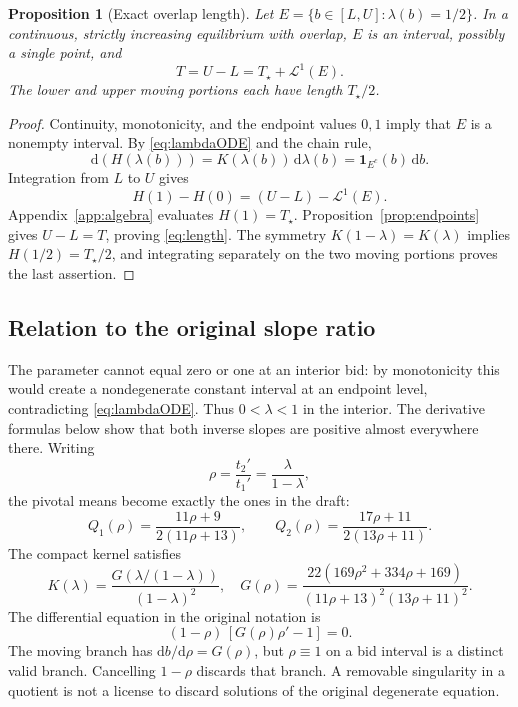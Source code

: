 \documentclass[11pt,a4paper]{article}
\numberwithin{equation}{section}
\newtheorem{proposition}[theorem]{Proposition}
\theoremstyle{definition}
\theoremstyle{remark}
\newcommand{\dd}{\,\mathrm d}
\newcommand{\Leb}{\mathcal L^1}
\newcommand{\ind}{\mathbf 1}
\newcommand{\Ts}{T_\star}
\begin{document}
\begin{proposition}[Exact overlap length]
\label{prop:length}
Let $E=\{b\in[L,U]:\lambda(b)=1/2\}$. In a continuous, strictly increasing equilibrium with overlap, $E$ is an interval, possibly a single point, and
\begin{equation}
\label{eq:length}
 T=U-L=\Ts+\Leb(E).
\end{equation}
The lower and upper moving portions each have length $\Ts/2$.
\end{proposition}
\begin{proof}
Continuity, monotonicity, and the endpoint values $0,1$ imply that $E$ is a nonempty interval. By \eqref{eq:lambdaODE} and the chain rule,
\[
 \mathrm d(H(\lambda(b)))
 =K(\lambda(b))\,\mathrm d\lambda(b)
 =\ind_{E^c}(b)\dd b.
\]
Integration from $L$ to $U$ gives
\[
 H(1)-H(0)=(U-L)-\Leb(E).
\]
Appendix~\ref{app:algebra} evaluates $H(1)=\Ts$. Proposition~\ref{prop:endpoints} gives $U-L=T$, proving \eqref{eq:length}. The symmetry $K(1-\lambda)=K(\lambda)$ implies $H(1/2)=\Ts/2$, and integrating separately on the two moving portions proves the last assertion.
\end{proof}

\subsection{Relation to the original slope ratio}
The parameter cannot equal zero or one at an interior bid: by monotonicity this would create a nondegenerate constant interval at an endpoint level, contradicting \eqref{eq:lambdaODE}. Thus $0<\lambda<1$ in the interior. The derivative formulas below show that both inverse slopes are positive almost everywhere there. Writing
\[
 \rho=\frac{t_2'}{t_1'}=\frac{\lambda}{1-\lambda},
\]
the pivotal means become exactly the ones in the draft:
\[
 Q_1(\rho)=\frac{11\rho+9}{2(11\rho+13)},\qquad
 Q_2(\rho)=\frac{17\rho+11}{2(13\rho+11)}.
\]
The compact kernel satisfies
\[
 K(\lambda)=\frac{G(\lambda/(1-\lambda))}{(1-\lambda)^2},
\quad
 G(\rho)=\frac{22(169\rho^2+334\rho+169)}
 {(11\rho+13)^2(13\rho+11)^2}.
\]
The differential equation in the original notation is
\begin{equation}
\label{eq:rhoODE}
 (1-\rho)\,[G(\rho)\rho'-1]=0.
\end{equation}
The moving branch has $\mathrm db/\mathrm d\rho=G(\rho)$, but $\rho\equiv1$ on a bid interval is a distinct valid branch. Cancelling $1-\rho$ discards that branch. A removable singularity in a quotient is not a license to discard solutions of the original degenerate equation.
\end{document}
